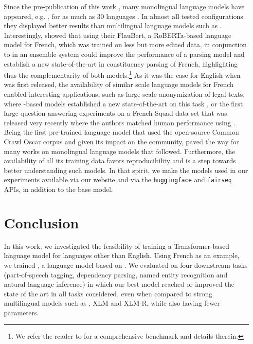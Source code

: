 Since the pre-publication of this work \citep{martin-etal-2020-camembert},
many monolingual language models have appeared, e.g.
\citep{le-etal-2020-flaubert-unsupervised,virtanen-etal-2019-multilingual,delobelle-etal-2020-robbert}, for as much as 30
languages \citep{nozza-etal-2020-what}. In almost all tested
configurations they displayed better results than multilingual
language models such as \mbert \citep{pires-etal-2019-multilingual}.
Interestingly, \citet{le-etal-2020-flaubert-unsupervised} showed that using their
FlauBert, a RoBERTa-based language model for French, which was trained on less
but more edited data, in conjunction to \camembert in an ensemble
system could improve the performance of a parsing model and  establish
a new state-of-the-art in constituency parsing of French, highlighting thus
the complementarity of both models.\footnote{We refer the reader to
    \citep{le-etal-2020-flaubert-unsupervised} for a comprehensive benchmark and details
    therein.}
As it was the case for English when \bert was first released, the
availability of similar scale language models for French enabled
interesting applications, such as large scale anonymization of legal
texts, where \camembert-based models established a new
state-of-the-art on this task \citep{benesty-2019-ner}, or the first
large question answering experiments on a French Squad data set that
was released very recently \citep{dhoffschmidt-etal-2020-fquad} where the authors matched human performance using \camembertlarge.
Being the first pre-trained language model that used the open-source Common Crawl Oscar
corpus and given its impact on the community,
\camembert paved the way for many works on monolingual language
models that followed. Furthermore, the availability of all its
training data favors reproducibility and is a step towards better
understanding such models.
In that spirit, we make the models used in our experiments available via our website and via the \texttt{huggingface} and \texttt{fairseq} APIs, in addition to the base \camembert model.

\section{Conclusion}
In this work, we investigated the feasibility of training a
Transformer-based language model for languages other than English.
Using French as an example, we trained \camembert, a language model
based on \roberta.
We evaluated \camembert on four downstream tasks
(part-of-speech tagging, dependency parsing, named entity recognition
and natural language inference) in which our best model reached or improved the state of the art in all tasks
considered, even when compared to strong multilingual models such as
\mbert, XLM and XLM-R, while also having fewer parameters.

